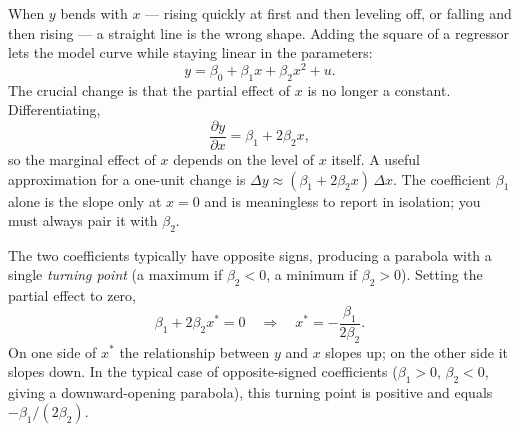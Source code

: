 When $y$ bends with $x$ --- rising quickly at first and then leveling off, or falling and then rising --- a straight line is the wrong shape. Adding the square of a regressor lets the model curve while staying linear in the parameters:
\[
y = \beta_0 + \beta_1 x + \beta_2 x^2 + u .
\]
The crucial change is that the partial effect of $x$ is no longer a constant. Differentiating,
\[
\frac{\partial y}{\partial x} = \beta_1 + 2\beta_2 x ,
\]
so the marginal effect of $x$ depends on the level of $x$ itself. A useful approximation for a one-unit change is $\Delta y \approx (\beta_1 + 2\beta_2 x)\,\Delta x$. The coefficient $\beta_1$ alone is the slope only at $x=0$ and is meaningless to report in isolation; you must always pair it with $\beta_2$.

The two coefficients typically have opposite signs, producing a parabola with a single \emph{turning point} (a maximum if $\beta_2<0$, a minimum if $\beta_2>0$). Setting the partial effect to zero,
\[
\beta_1 + 2\beta_2 x^* = 0
\quad\Longrightarrow\quad
x^* = -\frac{\beta_1}{2\beta_2} .
\]
On one side of $x^*$ the relationship between $y$ and $x$ slopes up; on the other side it slopes down. In the typical case of opposite-signed coefficients ($\beta_1>0$, $\beta_2<0$, giving a downward-opening parabola), this turning point is positive and equals $-\beta_1/(2\beta_2)$.


